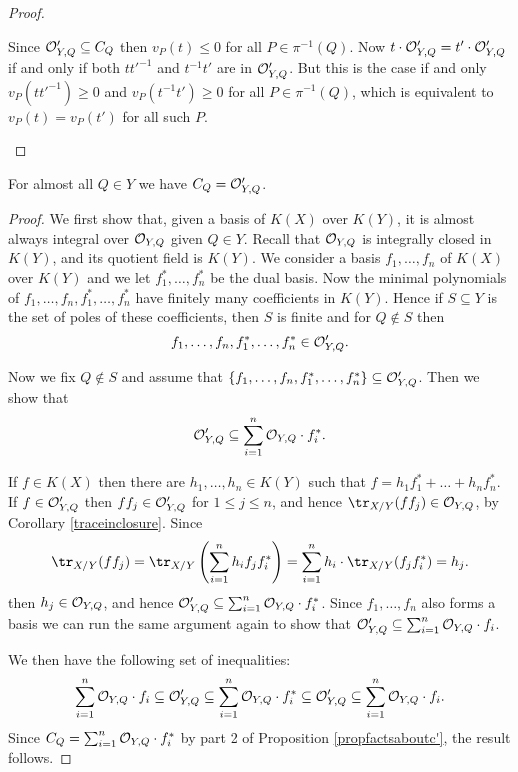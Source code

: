 \begin{proof}
\begin{enumerate}
        
        
        Since ${\cal O}_{Y,Q}'\subseteq C_Q$ then $v_P(t)\leq 0$ for all $P\in \pi^{-1}(Q)$.
        Now $t\cdot {\cal O}_{Y,Q}' = t'\cdot {\cal O}_{Y,Q}'$ if and only if both $tt'^{-1}$ and $t^{-1}t'$ are in ${\cal O}_{Y,Q}'$.
        But this is the case if and only $v_P(tt'^{-1}) \geq 0$ and $v_P(t^{-1}t')\geq 0$ for all $P\in \pi^{-1}(Q)$, which is equivalent to $v_P(t)=v_P(t')$ for all such $P$.
        \end{enumerate}
    \end{proof}

    \begin{prop}\label{almostallqiny}
    For almost all $Q\in Y$ we have $C_Q= {\cal O}_{Y,Q}'$.
    \end{prop}
    \begin{proof}
    We first show that, given a basis of $K(X)$ over $K(Y)$, it is almost always integral over ${\cal O}_{Y,Q}$ given $Q\in Y$.
    Recall that ${\cal O}_{Y,Q}$ is integrally closed in $K(Y)$, and its quotient field is $K(Y)$.
    We consider a basis $f_1,\ldots ,f_n$ of $K(X)$ over $K(Y)$ and we let $f_1^*,\ldots ,f_n^*$ be the dual basis.
    Now the minimal polynomials of $f_1,\ldots, f_n,f_1^*,\ldots, f_n^*$ have finitely many coefficients in $K(Y)$.
    Hence if $S\subseteq Y$ is the set of poles of these coefficients, then $S$ is finite and for $Q\notin S$ then 
        \[
        f_1,\ldots,f_n,f_1^*,\ldots, f_n^*\in {\cal O}_{Y,Q}'.
        \]
    
    Now we fix $Q \notin S$ and assume that $\{f_1,\ldots ,f_n,f_1^*,\ldots, f_n^*\}\subseteq {\cal O}_{Y,Q}'$. 
    Then we show that 
        \[
        {\cal O}_{Y,Q}' \subseteq \sum_{i=1}^n {\cal O}_{Y,Q}\cdot f_i^*.
        \]
    
    If $f\in K(X)$ then there are $h_1,\ldots, h_n\in K(Y)$ such that $f=h_1f_1^*+\ldots +h_nf_n^*$.
    If $f\in {\cal O}_{Y,Q}'$ then $ff_j\in {\cal O}_{Y,Q}'$ for $1\leq j\leq n$, and hence $\tr_{X/Y}(ff_j)\in \cO_{Y,Q}$, by Corollary \ref{traceinclosure}.
    Since
        \[
        \tr_{X/Y}(ff_j) = \tr_{X/Y}\left(\sum_{i=1}^n h_if_jf_i^*\right) = \sum_{i=1}^nh_i\cdot \tr_{X/Y}(f_jf_i^*) = h_j.
        \]
    then $h_j\in {\cal O}_{Y,Q}$, and hence ${\cal O}_{Y,Q}'\subseteq \sum_{i=1}^n{\cal O}_{Y,Q}\cdot f_i^*$.
    Since $f_1,\ldots, f_n$ also forms a basis we can run the same argument again to show that ${\cal O}_{Y,Q}'\subseteq \sum_{i=1}^n{\cal O}_{Y,Q}\cdot f_i$.
    
    We then have the following set of inequalities:
        \[
        \sum_{i=1}^n {\cal O}_{Y,Q}\cdot f_i \subseteq {\cal O}_{Y,Q}' \subseteq \sum_{i=1}^n{\cal O}_{Y,Q}\cdot f_i^* \subseteq {\cal O}_{Y,Q}'\subseteq \sum_{i=1}^n {\cal O}_{Y,Q}\cdot f_i.
        \]
        Since $C_Q = \sum_{i=1}^n {\cal O}_{Y,Q}\cdot f_i^*$ by part 2 of Proposition \ref{propfactsaboutc'}, the result follows.
    \end{proof}

